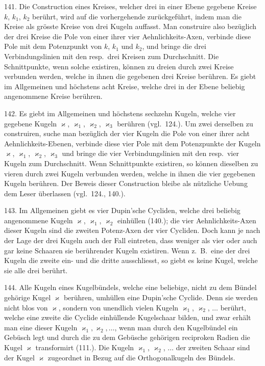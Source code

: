 141. Die Construction eines Kreises, welcher drei in
einer Ebene gegebene Kreise $k$, $k_1$, $k_2$ ber\"uhrt, wird auf die
vorhergehende zur\"uckgef\"uhrt, indem man die Kreise als gr\"osste
Kreise von drei Kugeln auf\/fasst. Man construire also bez\"uglich
der drei Kreise die Pole von einer ihrer vier Aehnlichkeits-Axen,
verbinde diese Pole mit dem Potenzpunkt von
$k$, $k_1$ und $k_2$, und bringe die drei Verbindungslinien mit den
resp.\ drei Kreisen zum Durchschnitt. Die Schnittpunkte,
wenn solche existiren, k\"onnen zu dreien durch zwei Kreise
verbunden werden, welche in ihnen die gegebenen drei Kreise
ber\"uhren. Es giebt im Allgemeinen und h\"ochstens acht
Kreise, welche drei in der Ebene beliebig angenommene Kreise
ber\"uhren.

142. Es giebt im Allgemeinen und h\"ochstens sechzehn
Kugeln, welche vier gegebene Kugeln $\varkappa$, $\varkappa_1$, $\varkappa_2$, $\varkappa_3$ ber\"uhren
(vgl.\ 124.). Um zwei derselben zu construiren, suche man
bez\"uglich der vier Kugeln die Pole von einer ihrer acht
Aehnlichkeits-Ebenen, verbinde diese vier Pole mit dem Potenzpunkte
der Kugeln $\varkappa$, $\varkappa_1$, $\varkappa_2$, $\varkappa_3$ und bringe die vier
Verbindungslinien mit den resp.\ vier Kugeln zum Durchschnitt.
Wenn Schnittpunkte existiren, so k\"onnen dieselben zu vieren
durch zwei Kugeln verbunden werden, welche in ihnen die
vier gegebenen Kugeln ber\"uhren. Der Beweis dieser
Construction bleibe als n\"utzliche Uebung dem Leser \"uberlassen
(vgl.\ 124., 140.).

143. Im Allgemeinen giebt es vier Dupin'sche Cycliden,
welche drei beliebig angenommene Kugeln $\varkappa$, $\varkappa_1$, $\varkappa_2$ einh\"ullen
(140.); die vier Aehnlichkeits-Axen dieser Kugeln sind die
zweiten Potenz-Axen der vier Cycliden. Doch kann je nach
der Lage der drei Kugeln auch der Fall eintreten, dass weniger
als vier oder auch gar keine Schaaren sie ber\"uhrender Kugeln
existiren. Wenn z.~B.\ eine der drei Kugeln die zweite ein- und
die dritte ausschliesst, so giebt es keine Kugel, welche
sie alle drei ber\"uhrt.

144. Alle Kugeln eines Kugelb\"undels, welche eine beliebige,
nicht zu dem B\"undel geh\"orige Kugel $\varkappa$ ber\"uhren,
umh\"ullen eine Dupin'sche Cyclide. Denn sie werden nicht
blos von $\varkappa$, sondern von unendlich vielen Kugeln $\varkappa_1$, $\varkappa_2$, $\ldots$
ber\"uhrt, welche eine zweite die Cyclide einh\"ullende Kugelschaar
bilden, und zwar erh\"alt man eine dieser Kugeln $\varkappa_1,
\varkappa_2, \ldots$, wenn man durch den Kugelb\"undel ein Geb\"usch legt
und durch die zu dem Geb\"usche geh\"origen reciproken Radien
die Kugel $\varkappa$ transformirt (111.). Die Kugeln $\varkappa_1$, $\varkappa_2$, $\ldots$ der
zweiten Schaar sind der Kugel $\varkappa$ zugeordnet in Bezug auf
die Orthogonalkugeln des B\"undels.

